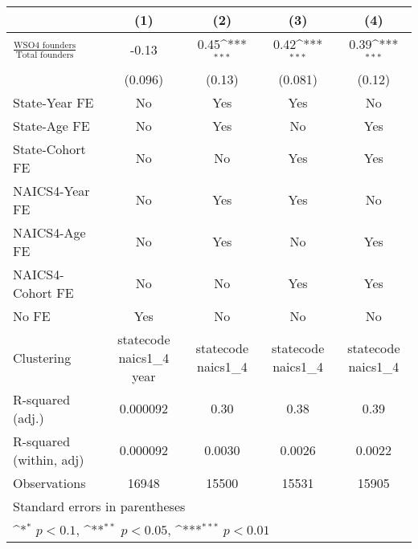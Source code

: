 {
\def\sym#1{\ifmmode^{#1}\else\(^{#1}\)\fi}
\begin{tabular}{l*{4}{c}}
\toprule
                    &\multicolumn{1}{c}{(1)}         &\multicolumn{1}{c}{(2)}         &\multicolumn{1}{c}{(3)}         &\multicolumn{1}{c}{(4)}         \\
\midrule
$\frac{\text{WSO4 founders}}{\text{Total founders}}$&       -0.13         &        0.45\sym{***}&        0.42\sym{***}&        0.39\sym{***}\\
                    &     (0.096)         &      (0.13)         &     (0.081)         &      (0.12)         \\
\addlinespace
State-Year FE       &          No         &         Yes         &         Yes         &          No         \\
\addlinespace
State-Age FE        &          No         &         Yes         &          No         &         Yes         \\
\addlinespace
State-Cohort FE     &          No         &          No         &         Yes         &         Yes         \\
\addlinespace
NAICS4-Year FE      &          No         &         Yes         &         Yes         &          No         \\
\addlinespace
NAICS4-Age FE       &          No         &         Yes         &          No         &         Yes         \\
\addlinespace
NAICS4-Cohort FE    &          No         &          No         &         Yes         &         Yes         \\
\addlinespace
No FE               &         Yes         &          No         &          No         &          No         \\
\midrule
Clustering          &statecode naics1\_4 year         &statecode naics1\_4         &statecode naics1\_4         &statecode naics1\_4         \\
R-squared (adj.)    &    0.000092         &        0.30         &        0.38         &        0.39         \\
R-squared (within, adj)&    0.000092         &      0.0030         &      0.0026         &      0.0022         \\
Observations        &       16948         &       15500         &       15531         &       15905         \\
\bottomrule
\multicolumn{5}{l}{\footnotesize Standard errors in parentheses}\\
\multicolumn{5}{l}{\footnotesize \sym{*} \(p<0.1\), \sym{**} \(p<0.05\), \sym{***} \(p<0.01\)}\\
\end{tabular}
}
